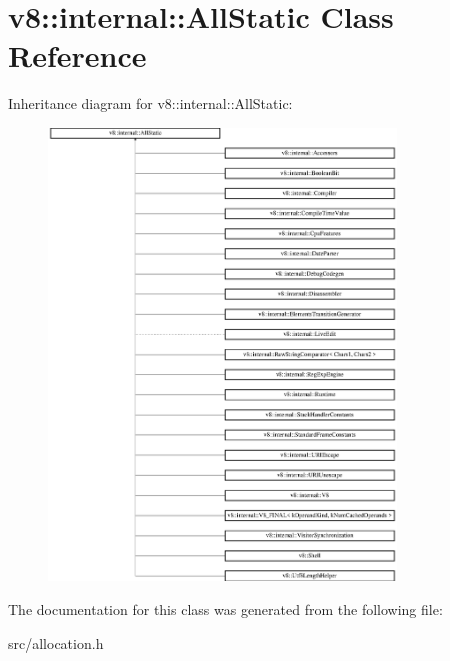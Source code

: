\hypertarget{classv8_1_1internal_1_1_all_static}{}\section{v8\+:\+:internal\+:\+:All\+Static Class Reference}
\label{classv8_1_1internal_1_1_all_static}
Inheritance diagram for v8\+:\+:internal\+:\+:All\+Static\+:\begin{figure}[H]
\begin{center}
\leavevmode
\includegraphics[height=12.000000cm]{classv8_1_1internal_1_1_all_static}
\end{center}
\end{figure}


The documentation for this class was generated from the following file\+:\begin{DoxyCompactItemize}
\item 
src/allocation.\+h\end{DoxyCompactItemize}
